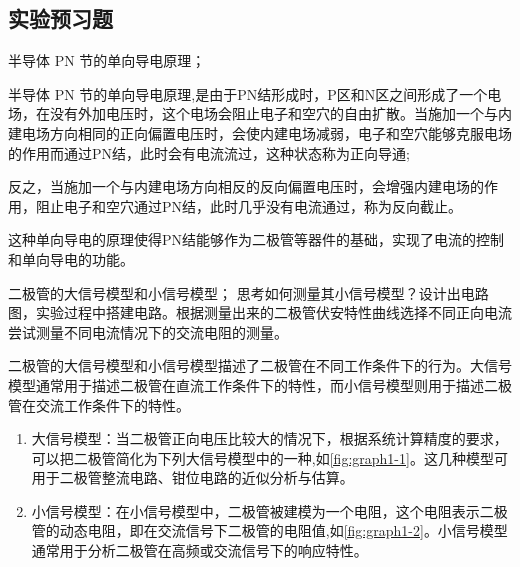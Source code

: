 \documentclass[dvipsnames, svgnames,a4paper,11pt]{article}
\begin{document}


	
	
	\clearpage
	\subsection{实验预习题}
	

		\begin{question}
			半导体 PN 节的单向导电原理；
		\end{question}

		半导体 PN 节的单向导电原理,是由于PN结形成时，P区和N区之间形成了一个电场，在没有外加电压时，这个电场会阻止电子和空穴的自由扩散。当施加一个与内建电场方向相同的正向偏置电压时，会使内建电场减弱，电子和空穴能够克服电场的作用而通过PN结，此时会有电流流过，这种状态称为正向导通;
		
		反之，当施加一个与内建电场方向相反的反向偏置电压时，会增强内建电场的作用，阻止电子和空穴通过PN结，此时几乎没有电流通过，称为反向截止。
		
		这种单向导电的原理使得PN结能够作为二极管等器件的基础，实现了电流的控制和单向导电的功能。


		\begin{question}
			二极管的大信号模型和小信号模型； 思考如何测量其小信号模型？设计出电路图，实验过程中搭建电路。根据测量出来的二极管伏安特性曲线选择不同正向电流尝试测量不同电流情况下的交流电阻的测量。
		\end{question}

		二极管的大信号模型和小信号模型描述了二极管在不同工作条件下的行为。大信号模型通常用于描述二极管在直流工作条件下的特性，而小信号模型则用于描述二极管在交流工作条件下的特性。

		\begin{enumerate}
			\item 大信号模型：当二极管正向电压比较大的情况下，根据系统计算精度的要求，可以把二极管简化为下列大信号模型中的一种,如\cref{fig:graph1-1}。这几种模型可用于二极管整流电路、钳位电路的近似分析与估算。
			

			\item 小信号模型：在小信号模型中，二极管被建模为一个电阻，这个电阻表示二极管的动态电阻，即在交流信号下二极管的电阻值,如\cref{fig:graph1-2}。小信号模型通常用于分析二极管在高频或交流信号下的响应特性。
			

		\end{enumerate}
\end{document}
